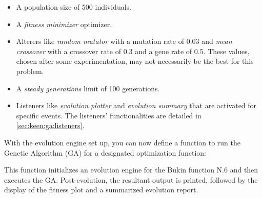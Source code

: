     \begin{itemize}
      \item A population size of 500 individuals.
      \item A \textit{fitness minimizer} optimizer.
      \item Alterers like \textit{random mutator} with a mutation rate of 0.03 
        and \textit{mean crossover} with a crossover rate of 0.3 and a gene 
        rate of 0.5. These values, chosen after some experimentation, may not 
        necessarily be the best for this problem.
      \item A \textit{steady generations} limit of 100 generations.
      \item Listeners like \textit{evolution plotter} and \textit{evolution 
        summary} that are activated for specific events. The listeners' 
        functionalities are detailed in \vref{sec:keen:ga:listeners}.
    \end{itemize}

    With the evolution engine set up, you can now define a function to run the 
    Genetic Algorithm (GA) for a designated optimization function:


    This function initializes an evolution engine for the Bukin function N.6 
    and then executes the GA. Post-evolution, the resultant output is printed, 
    followed by the display of the fitness plot and a summarized evolution 
    report.
    